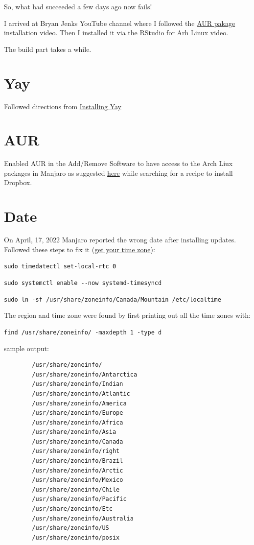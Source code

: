 \documentclass[]{scrartcl}
\begin{document}
	So, what had succeeded a few days ago now fails!
	
	I arrived at Bryan Jenks YouTube channel where I followed the \href{https://www.youtube.com/watch?v=FhvEJxrzABI}{AUR pakage installation
	video}. Then I installed it via the \href{https://www.youtube.com/watch?v=XAId0j7RR0c}{RStudio for Arh Linux video}.
	
	The build part takes a while.
	
	\section{Yay}
	\label{sec:yay}
	
	Followed directions from \href{https://www.tecmint.com/install-yay-aur-helper-in-arch-linux-and-manjaro/}{Installing Yay}
	
	\section{AUR}
	
	Enabled AUR in the Add/Remove Software to have access to the Arch Liux packages in Manjaro as suggested \href{https://forum.manjaro.org/t/dropbox-install-new-to-manjaro/9576/5}{here} while searching for a recipe to install Dropbox.
	
	\section{Date}
	
	On April, 17, 2022 Manjaro reported the wrong date after installing updates.
	Followed these steps to fix it (\href{https://archived.forum.manjaro.org/t/howto-get-your-time-timezone-right-using-manjaro-windows-dual-boot/89359}{get your time zone}):
	\begin{compactenum}
		\item  \verb|sudo timedatectl set-local-rtc 0|
		\item \verb|sudo systemctl enable --now systemd-timesyncd|
		\item \verb|sudo ln -sf /usr/share/zoneinfo/Canada/Mountain /etc/localtime|
	\end{compactenum}
	
	The region and time zone were found by first printing out all the time zones with:
	
	\verb|find /usr/share/zoneinfo/ -maxdepth 1 -type d|
	
	sample output:
	
	\begin{verbatim}
		/usr/share/zoneinfo/
		/usr/share/zoneinfo/Antarctica
		/usr/share/zoneinfo/Indian
		/usr/share/zoneinfo/Atlantic
		/usr/share/zoneinfo/America
		/usr/share/zoneinfo/Europe
		/usr/share/zoneinfo/Africa
		/usr/share/zoneinfo/Asia
		/usr/share/zoneinfo/Canada
		/usr/share/zoneinfo/right
		/usr/share/zoneinfo/Brazil
		/usr/share/zoneinfo/Arctic
		/usr/share/zoneinfo/Mexico
		/usr/share/zoneinfo/Chile
		/usr/share/zoneinfo/Pacific
		/usr/share/zoneinfo/Etc
		/usr/share/zoneinfo/Australia
		/usr/share/zoneinfo/US
		/usr/share/zoneinfo/posix
	\end{verbatim}
	
\end{document}
